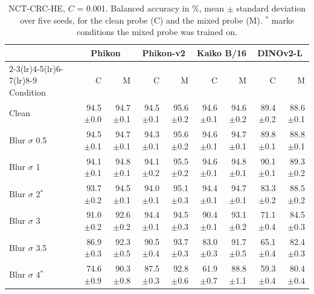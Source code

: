 \begin{table}[H]\centering\small
\caption{NCT-CRC-HE, $C$ = 0.001. Balanced accuracy in \%, mean $\pm$ standard deviation over five seeds, for the clean probe (C) and the mixed probe (M). $^{*}$ marks conditions the mixed probe was trained on.}
\label{tab:app2}
\setlength{\tabcolsep}{3.5pt}
\begin{tabular}{lrrrrrrrr}
\toprule
 & \multicolumn{2}{c}{Phikon} & \multicolumn{2}{c}{Phikon-v2} & \multicolumn{2}{c}{Kaiko B/16} & \multicolumn{2}{c}{DINOv2-L} \\
\cmidrule(lr){2-3}\cmidrule(lr){4-5}\cmidrule(lr){6-7}\cmidrule(lr){8-9}
Condition & C & M & C & M & C & M & C & M \\
\midrule
Clean & 94.5{\scriptsize$\pm$0.0} & 94.7{\scriptsize$\pm$0.1} & 94.5{\scriptsize$\pm$0.1} & 95.6{\scriptsize$\pm$0.2} & 94.6{\scriptsize$\pm$0.1} & 94.6{\scriptsize$\pm$0.2} & 89.4{\scriptsize$\pm$0.2} & 88.6{\scriptsize$\pm$0.1} \\
\addlinespace
Blur $\sigma$ 0.5 & 94.5{\scriptsize$\pm$0.1} & 94.7{\scriptsize$\pm$0.1} & 94.3{\scriptsize$\pm$0.1} & 95.6{\scriptsize$\pm$0.2} & 94.6{\scriptsize$\pm$0.1} & 94.7{\scriptsize$\pm$0.1} & 89.8{\scriptsize$\pm$0.1} & 88.8{\scriptsize$\pm$0.1} \\
Blur $\sigma$ 1 & 94.1{\scriptsize$\pm$0.1} & 94.8{\scriptsize$\pm$0.1} & 94.1{\scriptsize$\pm$0.2} & 95.5{\scriptsize$\pm$0.2} & 94.6{\scriptsize$\pm$0.1} & 94.8{\scriptsize$\pm$0.1} & 90.1{\scriptsize$\pm$0.1} & 89.3{\scriptsize$\pm$0.2} \\
Blur $\sigma$ 2$^{*}$ & 93.7{\scriptsize$\pm$0.2} & 94.5{\scriptsize$\pm$0.1} & 94.0{\scriptsize$\pm$0.1} & 95.1{\scriptsize$\pm$0.3} & 94.4{\scriptsize$\pm$0.1} & 94.7{\scriptsize$\pm$0.1} & 83.3{\scriptsize$\pm$0.2} & 88.5{\scriptsize$\pm$0.2} \\
Blur $\sigma$ 3 & 91.0{\scriptsize$\pm$0.2} & 92.6{\scriptsize$\pm$0.2} & 94.4{\scriptsize$\pm$0.1} & 94.5{\scriptsize$\pm$0.3} & 90.4{\scriptsize$\pm$0.1} & 93.1{\scriptsize$\pm$0.2} & 71.1{\scriptsize$\pm$0.4} & 84.5{\scriptsize$\pm$0.3} \\
Blur $\sigma$ 3.5 & 86.9{\scriptsize$\pm$0.3} & 92.3{\scriptsize$\pm$0.5} & 90.5{\scriptsize$\pm$0.4} & 93.7{\scriptsize$\pm$0.3} & 83.0{\scriptsize$\pm$0.3} & 91.7{\scriptsize$\pm$0.5} & 65.1{\scriptsize$\pm$0.4} & 82.4{\scriptsize$\pm$0.3} \\
Blur $\sigma$ 4$^{*}$ & 74.6{\scriptsize$\pm$0.9} & 90.3{\scriptsize$\pm$0.8} & 87.5{\scriptsize$\pm$0.3} & 92.8{\scriptsize$\pm$0.6} & 61.9{\scriptsize$\pm$0.7} & 88.8{\scriptsize$\pm$1.1} & 59.3{\scriptsize$\pm$0.4} & 80.4{\scriptsize$\pm$0.4} \\

\end{tabular}
\end{table}
